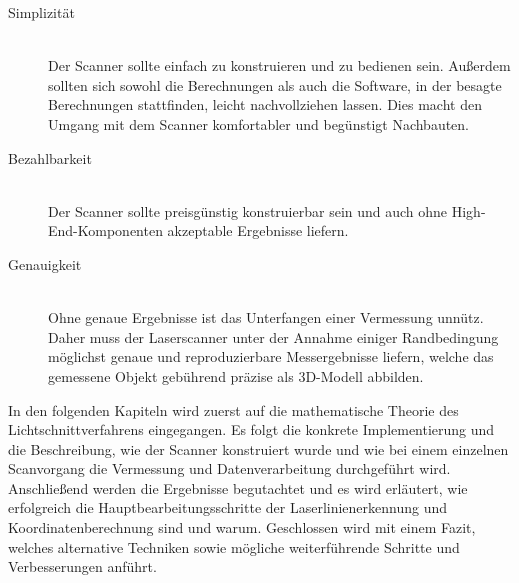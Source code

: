 \begin{description}
\item[Simplizität] \hfill \\
Der Scanner sollte einfach zu konstruieren und zu bedienen sein. Außerdem sollten sich sowohl die Berechnungen als auch die Software, in der besagte Berechnungen stattfinden, leicht nachvollziehen lassen. Dies macht den Umgang mit dem Scanner komfortabler und begünstigt Nachbauten.
\item[Bezahlbarkeit] \hfill \\		
Der Scanner sollte preisgünstig konstruierbar sein und auch ohne High-End-Komponenten akzeptable Ergebnisse liefern.  
\item[Genauigkeit] \hfill \\  		
Ohne genaue Ergebnisse ist das Unterfangen einer Vermessung unnütz. Daher muss der Laserscanner unter der Annahme einiger Randbedingung möglichst genaue und reproduzierbare Messergebnisse liefern, welche das gemessene Objekt gebührend präzise als 3D-Modell abbilden.
\end{description}
In den folgenden Kapiteln wird zuerst auf die mathematische Theorie des Lichtschnittverfahrens eingegangen. Es folgt die konkrete Implementierung und die Beschreibung, wie der Scanner konstruiert wurde und wie bei einem einzelnen Scanvorgang die Vermessung und Datenverarbeitung durchgeführt wird. Anschließend werden die Ergebnisse begutachtet und es wird erläutert, wie erfolgreich die Hauptbearbeitungsschritte der Laserlinienerkennung und Koordinatenberechnung sind und warum. Geschlossen wird mit einem Fazit, welches alternative Techniken sowie mögliche weiterführende Schritte und Verbesserungen anführt.  